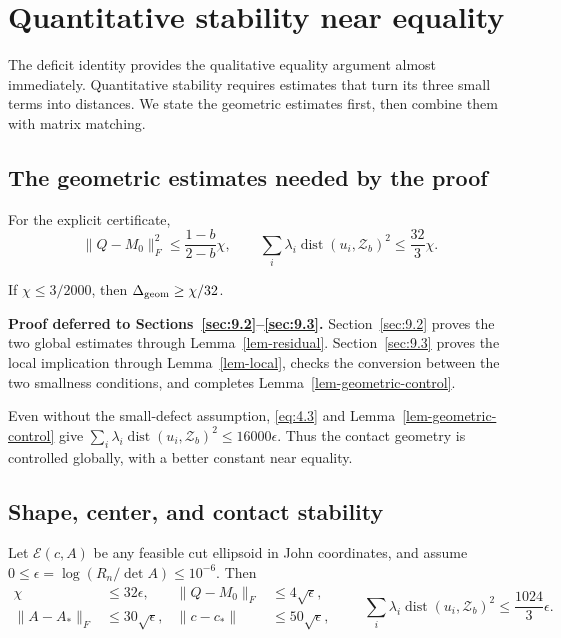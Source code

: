 \section{Quantitative stability near equality}\label{sec:6}

The deficit identity provides the qualitative equality argument almost immediately. Quantitative stability requires estimates that turn its three small terms into distances. We state the geometric estimates first, then combine them with matrix matching.

\subsection{The geometric estimates needed by the proof}\label{sec:6.1}

\begin{lemma}\label{lem-geometric-control}
For the explicit certificate,
\begin{equation}\label{eq:6.1}
\|Q-M_0\|_F^2\le\frac{1-b}{2-b}\chi,\qquad
\sum_i\lambda_i\operatorname{dist}(u_i,\mathcal Z_b)^2
\le\frac{32}{3}\chi.
\end{equation}

If $\chi\le3/2000$, then $\Delta_{\rm geom}\ge\chi/32$.

\end{lemma}

\textbf{Proof deferred to Sections~\ref{sec:9.2}--\ref{sec:9.3}.} Section~\ref{sec:9.2} proves the two global
estimates through Lemma~\ref{lem-residual}. Section~\ref{sec:9.3} proves the local implication through
Lemma~\ref{lem-local}, checks the conversion between the two smallness conditions, and
completes Lemma~\ref{lem-geometric-control}.

Even without the small-defect assumption, \eqref{eq:4.3} and Lemma~\ref{lem-geometric-control} give
$\sum_i\lambda_i\operatorname{dist}(u_i,\mathcal Z_b)^2\le16000\epsilon$.
Thus the contact geometry is controlled globally, with a better constant near equality.

\subsection{Shape, center, and contact stability}\label{sec:6.2}

\begin{theorem}\label{thm-stability}
Let $\mathcal E(c,A)$ be any feasible cut ellipsoid in John coordinates, and assume
$0\le\epsilon=\log(R_n/\det A)\le10^{-6}$. Then
\begin{equation}\label{eq:6.2}
\begin{aligned}
\chi&\le32\epsilon,&
\|Q-M_0\|_F&\le4\sqrt\epsilon,\\
\|A-A_*\|_F&\le30\sqrt\epsilon,&
\|c-c_*\|&\le50\sqrt\epsilon,
\end{aligned}
\qquad
\sum_i\lambda_i\operatorname{dist}(u_i,\mathcal Z_b)^2
\le\frac{1024}{3}\epsilon.
\end{equation}

\end{theorem}

